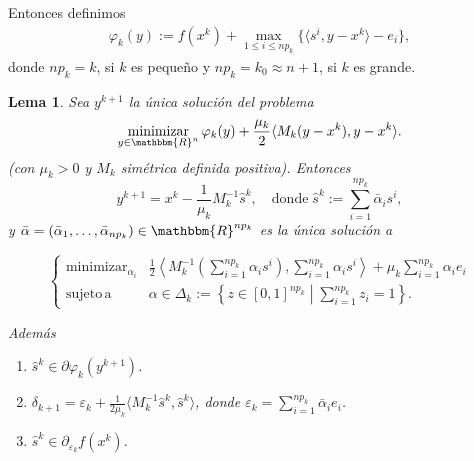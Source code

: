 \documentclass[a4paper,12pt]{report}
\newcommand{\la}{\langle}
\newcommand{\ra}{\rangle}
\newcommand{\lla}{\left\la}
\newcommand{\rra}{\right\ra}
\newcommand{\RR}{\mathbbm{R}}
\newcommand{\Rn}{\RR^n}
\newcommand{\vep}{\varepsilon}
\newcommand{\vfi}{\varphi}
\newtheorem{lem}[teo]{Lema}
\begin{document}
Entonces definimos
\begin{eqnarray*}
\vfi_{k}(y):=f(x^k)+\max_{1\leq i\leq np_k}\{\la s^i,y-x^k\ra-e_i\},
\end{eqnarray*}
donde $np_k=k$, si $k$ es peque\~{n}o y $np_k=k_0\approx n+1$, si $k$ es grande.


\begin{lem}
Sea $y^{k+1}$ la \'unica soluci\'on del problema
\begin{equation}\label{problema1}
\mathop\mathrm{minimizar}_{y\in\Rn}\vfi_k(y)+\frac{\mu_k}{2}\la M_k(y-x^k),y-x^k\ra.
\end{equation}
(con $\mu_k>0$ y $M_k$ sim\'etrica definida positiva). Entonces
$$
y^{k+1}=x^k-\frac{1}{\mu_k}M_k^{-1}\hat{s}^k,\quad\mbox{donde}\;\hat{s}^k:=\sum_{i=1}^{np_k}\bar{\alpha}_i s^i,
$$
y $\bar{\alpha}=(\bar{\alpha}_1,\ldots,\bar{\alpha}_{np_k})\in\RR^{np_k}$ es la \'unica soluci\'on a

\begin{equation}\label{problema2}
\left\{
\begin{array}{cc}
\displaystyle\mathop{\mathrm{minimizar}}_{\alpha_i}&\displaystyle\frac{1}{2}\lla M_k^{-1}\left(\sum_{i=1}^{np_k}\alpha_i s^i\right),\sum_{i=1}^{np_k}\alpha_i s^i \rra+\mu_k\sum_{i=1}^{np_k}\alpha_i e_i\\[1cm]
\mathrm{sujeto\, a}&\alpha\in\Delta_k:=\left\{z\in[0,1]^{np_k}\;\left|\; \displaystyle{\sum_{i=1}^{np_k}}z_i=1\right\}.\right.
\end{array}
\right.
\end{equation}

Adem\'as
\begin{enumerate}
\item $\hat{s}^k\in\partial\vfi_k(y^{k+1})$.
\item $\delta_{k+1}=\vep_k+\frac{1}{2\mu_k}\la M_k^{-1}\hat{s}^k,\hat{s}^k\ra$, donde $\vep_k=\sum_{i=1}^{np_k}\bar\alpha_i e_i$.
\item $\hat{s}^k\in\partial_{\vep_k}f(x^k)$.
\end{enumerate}
\end{lem}
\end{document}
